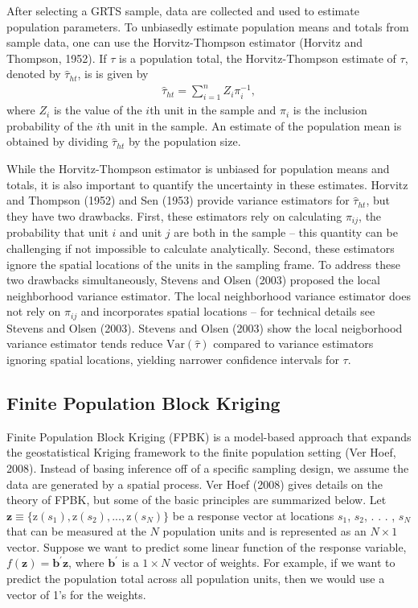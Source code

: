 \documentclass[]{elsarticle} %
\begin{document}
After selecting a GRTS sample, data are collected and used to estimate
population parameters. To unbiasedly estimate population means and
totals from sample data, one can use the Horvitz-Thompson estimator
(Horvitz and Thompson, 1952). If \(\tau\) is a population total, the
Horvitz-Thompson estimate of \(\tau\), denoted by \(\hat{\tau}_{ht}\),
is is given by \begin{align}\label{eq:ht}
  \hat{\tau}_{ht} = \sum_{i = 1}^n Z_i \pi_i^{-1},
\end{align} where \(Z_i\) is the value of the \(i\)th unit in the sample
and \(\pi_i\) is the inclusion probability of the \(i\)th unit in the
sample. An estimate of the population mean is obtained by dividing
\(\hat{\tau}_{ht}\) by the population size.

While the Horvitz-Thompson estimator is unbiased for population means
and totals, it is also important to quantify the uncertainty in these
estimates. Horvitz and Thompson (1952) and Sen (1953) provide variance
estimators for \(\hat{\tau}_{ht}\), but they have two drawbacks. First,
these estimators rely on calculating \(\pi_{ij}\), the probability that
unit \(i\) and unit \(j\) are both in the sample -- this quantity can be
challenging if not impossible to calculate analytically. Second, these
estimators ignore the spatial locations of the units in the sampling
frame. To address these two drawbacks simultaneously, Stevens and Olsen
(2003) proposed the local neighborhood variance estimator. The local
neighborhood variance estimator does not rely on \(\pi_{ij}\) and
incorporates spatial locations -- for technical details see Stevens and
Olsen (2003). Stevens and Olsen (2003) show the local neigborhood
variance estimator tends reduce \(\text{Var}(\hat{\tau})\) compared to
variance estimators ignoring spatial locations, yielding narrower
confidence intervals for \(\tau\).

\hypertarget{finite-population-block-kriging}{%
\subsection{Finite Population Block
Kriging}\label{finite-population-block-kriging}}

Finite Population Block Kriging (FPBK) is a model-based approach that
expands the geostatistical Kriging framework to the finite population
setting (Ver Hoef, 2008). Instead of basing inference off of a specific
sampling design, we assume the data are generated by a spatial process.
Ver Hoef (2008) gives details on the theory of FPBK, but some of the
basic principles are summarized below. Let
\({\mathbf{z} \equiv \{\text{z}(s_1), \text{z}(s_2), . . . , \text{z}(s_N) \}}\)
be a response vector at locations \(s_1\), \(s_2\), . . . , \(s_N\) that
can be measured at the \(N\) population units and is represented as an
\(N \times 1\) vector. Suppose we want to predict some linear function
of the response variable,
\(f(\mathbf{z}) = \mathbf{b}^\prime \mathbf{z}\), where
\(\mathbf{b}^\prime\) is a \(1 \times N\) vector of weights. For
example, if we want to predict the population total across all
population units, then we would use a vector of 1's for the weights.
\end{document}
